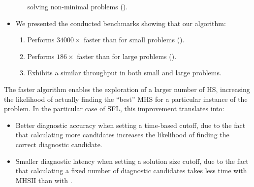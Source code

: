 \begin{itemize}[nolistsep]
\begin{itemize}
    solving non-minimal problems
    ().
  \end{itemize}
\item We presented the conducted benchmarks showing that our
  algorithm:
  \begin{enumerate}
  \item Performs $34000\times$ faster than \staccato{} for small
    problems ().
  \item Performs $186\times$ faster than \staccato{} for large
    problems ().
  \item Exhibits a similar throughput in both small and large
    problems.
  \end{enumerate}

\end{itemize}

The faster algorithm enables the exploration of a larger number of
\ac{HS}, increasing the likelihood of actually finding the ``best''
\ac{MHS} for a particular instance of the problem.
%
In the particular case of \ac{SFL}, this improvement translates into:
\begin{itemize}[nolistsep]
\item Better diagnostic accuracy when setting a time-based cutoff,
  due to the fact that calculating more candidates increases the
  likelihood of finding the correct diagnostic candidate.
\item Smaller diagnostic latency when setting a solution size cutoff,
  due to the fact that calculating a fixed number of diagnostic
  candidates takes less time with \ac{MHSII} than with \staccato{}.
\end{itemize}
